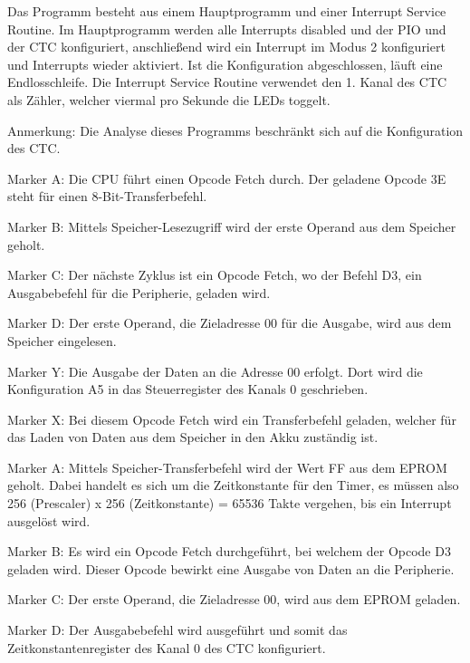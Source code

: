 Das Programm besteht aus einem Hauptprogramm und einer Interrupt Service Routine. Im Hauptprogramm werden alle Interrupts disabled und der PIO und der CTC konfiguriert, anschließend wird ein Interrupt im Modus 2 konfiguriert und Interrupts wieder aktiviert. Ist die Konfiguration abgeschlossen, läuft eine Endlosschleife. Die Interrupt Service Routine verwendet den 1. Kanal des CTC als Zähler, welcher viermal pro Sekunde die LEDs toggelt.

\begin{warning}
    Anmerkung: Die Analyse dieses Programms beschränkt sich auf die Konfiguration des CTC.
\end{warning}
Marker A: Die CPU führt einen Opcode Fetch durch. Der geladene Opcode 3E steht für einen 8-Bit-Transferbefehl.

Marker B: Mittels Speicher-Lesezugriff wird der erste Operand aus dem Speicher geholt.

Marker C: Der nächste Zyklus ist ein Opcode Fetch, wo der Befehl D3, ein Ausgabebefehl für die Peripherie, geladen wird.

Marker D: Der erste Operand, die Zieladresse 00 für die Ausgabe, wird aus dem Speicher eingelesen.

Marker Y: Die Ausgabe der Daten an die Adresse 00 erfolgt. Dort wird die Konfiguration A5 in das Steuerregister des Kanals 0 geschrieben.

Marker X: Bei diesem Opcode Fetch wird ein Transferbefehl geladen, welcher für das Laden von Daten aus dem Speicher in den Akku zuständig ist.

Marker A: Mittels Speicher-Transferbefehl wird der Wert FF aus dem EPROM geholt. Dabei handelt es sich um die Zeitkonstante für den Timer, es müssen also 256 (Prescaler) x 256 (Zeitkonstante) = 65536 Takte vergehen, bis ein Interrupt ausgelöst wird.

Marker B: Es wird ein Opcode Fetch durchgeführt, bei welchem der Opcode D3 geladen wird. Dieser Opcode bewirkt eine Ausgabe von Daten an die Peripherie.

Marker C: Der erste Operand, die Zieladresse 00, wird aus dem EPROM geladen.

Marker D: Der Ausgabebefehl wird ausgeführt und somit das Zeitkonstantenregister des Kanal 0 des CTC konfiguriert.

